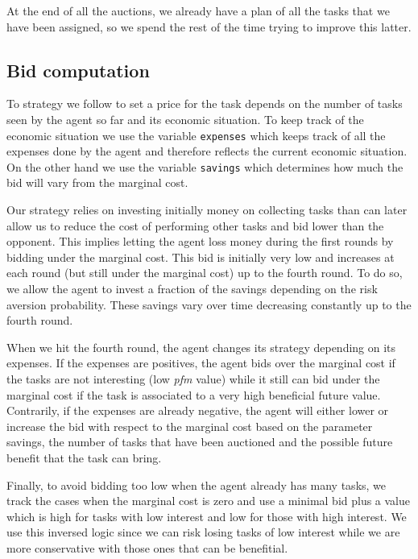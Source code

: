 \documentclass[11pt]{article}
\begin{document}
At the end of all the auctions, we already have a plan of all the tasks that we have been assigned, so we spend the rest of the time trying to improve this latter.

\subsection{Bid computation}
To strategy we follow to set a price for the task depends on the number of tasks seen by the agent so far and its economic situation. To keep track of the economic situation we use the variable \texttt{expenses} which keeps track of all the expenses done by the agent and therefore reflects the current economic situation. On the other hand we use the variable \texttt{savings} which determines how much the bid will vary from the marginal cost. 

Our strategy relies on investing initially money on collecting tasks than can later allow us to reduce the cost of performing other tasks and bid lower than the opponent. This implies letting the agent loss money during the first rounds by bidding under the marginal cost. This bid is initially very low and increases at each round (but still under the marginal cost) up to the fourth round. To do so, we allow the agent to invest a fraction of the savings depending on the risk aversion probability. These savings vary over time decreasing constantly up to the fourth round. 

When we hit the fourth round, the agent changes its strategy depending on its expenses. If the expenses are positives, the agent bids over the marginal cost if the tasks are not interesting (low \textit{pfm} value) while it still can bid under the marginal cost if the task is associated to a very high beneficial future value. Contrarily, if the expenses are already negative, the agent will either lower or increase the bid with respect to the marginal cost based on the parameter savings, the number of tasks that have been auctioned and the possible future benefit that the task can bring.

Finally, to avoid bidding too low when the agent already has many tasks, we track the cases when the marginal cost is zero and use a minimal bid plus a value which is high for tasks with low interest and low for those with high interest. We use this inversed logic since we can risk losing tasks of low interest while we are more conservative with those ones that can be benefitial. 

\end{document}
